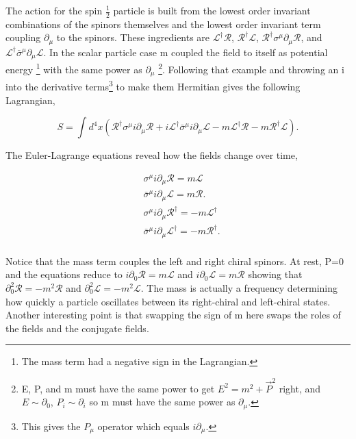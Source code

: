 The action for the spin $\frac{1}{2}$ particle is built from the lowest order invariant combinations of the spinors themselves and the lowest order invariant term coupling $\partial_\mu$ to the spinors. These ingredients are $\mathcal{L}^\dagger\mathcal{R}$, $\mathcal{R}^\dagger\mathcal{L}$, $\mathcal{R}^\dagger\sigma^\mu\partial_\mu\mathcal{R}$, and $\mathcal{L}^\dagger\bar{\sigma}^\mu\partial_\mu\mathcal{L}$. In the scalar particle case m coupled the field to itself as potential energy \footnote{The mass term had a negative sign in the Lagrangian.} with the same power as $\partial_\mu$ \footnote{E, P, and m must have the same power to get $E^2 = m^2 + \vec{P}^2$ right, and $E \sim \partial_0$, $P_i \sim \partial_i$ so m must have the same power as $\partial_\mu$.}. Following that example and throwing an i into the derivative terms\footnote{This gives the $P_\mu$ operator which equals $i\partial_\mu$.} to make them Hermitian gives the following Lagrangian,  

\begin{equation}
S = \int d^4x \left( \mathcal{R}^\dagger\sigma^\mu i\partial_\mu\mathcal{R} + i\mathcal{L}^\dagger\bar{\sigma}^\mu i\partial_\mu\mathcal{L} 
- m\mathcal{L}^\dagger\mathcal{R} - m\mathcal{R}^\dagger\mathcal{L} \right).
\end{equation} 

The Euler-Lagrange equations reveal how the fields change over time,

\begin{equation}
\begin{split}
& \sigma^\mu i\partial_\mu\mathcal{R} = m\mathcal{L} \\
& \bar{\sigma}^\mu i\partial_\mu\mathcal{L} = m\mathcal{R}. \\
& \sigma^\mu i\partial_\mu\mathcal{R}^\dagger = -m\mathcal{L}^\dagger \\
& \bar{\sigma}^\mu i\partial_\mu\mathcal{L}^\dagger = -m\mathcal{R}^\dagger. \\
\end{split}
\end{equation}

Notice that the mass term couples the left and right chiral spinors. At rest, P=0 and the equations reduce to $i\partial_0\mathcal{R} = m\mathcal{L}$ and $i\partial_0\mathcal{L} = m\mathcal{R}$ showing that $\partial^2_0 \mathcal{R} = -m^2\mathcal{R}$ and $\partial^2_0 \mathcal{L} = -m^2\mathcal{L}$. The mass is actually a frequency determining how quickly a particle oscillates between its right-chiral and left-chiral states. Another interesting point is that swapping the sign of m here swaps the roles of the fields and the conjugate fields. 

